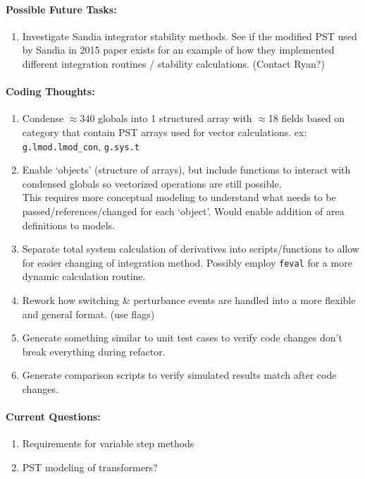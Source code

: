 \documentclass[12pt]{article}
\begin{document}
\begin{multicols}{2}
\vfill\null
\columnbreak

\paragraph{Possible Future Tasks:} %
	\begin{enumerate}
		\item Investigate Sandia integrator stability methods.	
		See if the modified PST used by Sandia in 2015 paper exists for an example of how they implemented different integration routines / stability calculations.	(Contact Ryan?)
	\end{enumerate}


\paragraph{Coding Thoughts:} 
	\begin{enumerate}

		\itemsep 0em 
		\item Condense $\approx$340 globals into 1 structured array with $\approx$18 fields based on category that contain PST arrays used for vector calculations. ex: \verb|g.lmod.lmod_con|, \verb|g.sys.t|
		\item Enable `objects' (structure of arrays), but include functions to interact with condensed globals so vectorized operations are still possible.\\
		This requires more conceptual modeling to understand what needs to be passed/references/changed for each `object'.
		Would enable addition of area definitions to models.
		\item Separate total system calculation of derivatives into scripts/functions to allow for easier changing of integration method.
		Possibly employ \verb|feval| for a more dynamic calculation routine.
		\item Rework how switching \& perturbance events are handled into a more flexible and general format. (use flags)
		\item Generate something similar to unit test cases to verify code changes don't break everything during refactor.
		\item Generate comparison scripts to verify simulated results match after code changes.
	\end{enumerate}
	


\paragraph{Current Questions:}
	\begin{enumerate}
	\itemsep0em 
	\item Requirements for variable step methods
	\item PST modeling of transformers?
	\end{enumerate}



\vfill\null
\end{multicols}
\end{document}
